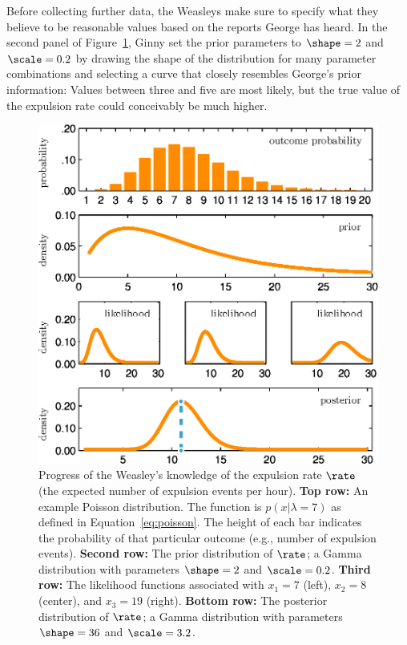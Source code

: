 Before collecting further data, the Weasleys make sure to specify what they believe to be reasonable values based on the reports George has heard.  
In {the second panel of} Figure~\ref{fig:bi0:poisson}, Ginny set the prior parameters to $\shape = 2$ and $\scale = 0.2$ by drawing the shape of the distribution for many parameter combinations and selecting a curve that closely resembles George's prior information: Values between three and five are most likely, but the true value of the expulsion rate could conceivably be much higher.

\begin{figure}[!t]
\centering
\includegraphics[scale=1%
]{figs/bi0_etzvandekerckhove_fig4}\vspace{2ex}
\caption{Progress of the Weasley's knowledge of the expulsion rate $\rate$ (the expected number of expulsion events per hour). {\textbf{Top row:} An example Poisson distribution. The function is  $p(x|\lambda=7)$ as defined in Equation~\ref{eq:poisson}. The height of each bar indicates the probability of that particular outcome (e.g., number of expulsion events).} \textbf{Second row:} The prior distribution of $\rate$; a Gamma distribution with parameters $\shape=2$ and $\scale=0.2$. \textbf{Third row:} The likelihood functions associated with $x_1=7$ (left), $x_2=8$ (center), and $x_3=19$ (right). \textbf{Bottom row:} The posterior distribution of $\rate$; a Gamma distribution with parameters $\shape=36$ and $\scale=3.2$.}
\label{fig:bi0:poisson}
\end{figure}

